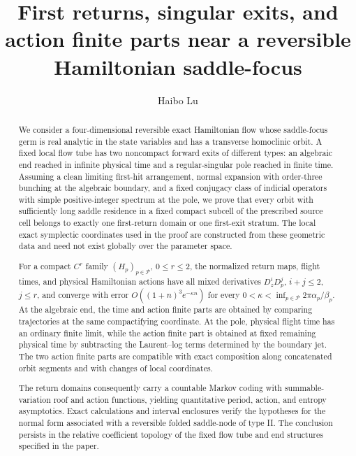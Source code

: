 \documentclass[11pt]{amsart}
\title[First returns, singular exits, and action finite parts]
{First returns, singular exits, and action finite parts
near a reversible Hamiltonian saddle-focus}
\author{Haibo Lu}
\date{}
\numberwithin{equation}{section}
\theoremstyle{definition}
\theoremstyle{remark}
\begin{document}
\begin{abstract}
We consider a four-dimensional reversible exact Hamiltonian flow whose
saddle-focus germ is real analytic in the state variables and has a
transverse homoclinic orbit.  A fixed local flow tube has two
noncompact forward exits of different types: an algebraic end reached in
infinite physical time and a regular-singular pole reached in finite time.
Assuming a clean limiting first-hit arrangement, normal expansion with
order-three bunching at the algebraic boundary, and a fixed conjugacy class
of indicial operators with simple positive-integer spectrum at the pole, we prove that every orbit
with sufficiently long saddle residence in a fixed compact subcell of the
prescribed source cell belongs to exactly one first-return domain or one
first-exit stratum.  The local exact
symplectic coordinates used in the
proof are constructed from these geometric data and need not exist
globally over the parameter space.

For a compact $C^r$ family $(H_p)_{p\in\mathcal P}$, $0\le r\le2$, the normalized return
maps, flight times, and physical Hamiltonian actions have all mixed
derivatives $D_z^iD_p^j$, $i+j\le2$, $j\le r$, and converge with error
$O((1+n)^3e^{-\kappa n})$ for every
$0<\kappa<\inf_{p\in\mathcal P}2\pi\alpha_p/\beta_p$.  At the algebraic
end, the time and action finite parts are obtained by comparing trajectories
at the same compactifying coordinate.  At the pole, physical flight time
has an ordinary finite limit, while the action finite part is obtained at
fixed remaining physical time by subtracting the Laurent--log terms
determined by the boundary jet.  The two action finite parts are compatible
with exact composition along
concatenated orbit segments and with changes of local coordinates.

The return domains consequently carry a countable Markov coding with
summable-variation roof and action functions, yielding quantitative
period, action, and entropy asymptotics.  Exact calculations and interval
enclosures verify the hypotheses for the normal form associated with a
reversible folded saddle-node of type II.  The conclusion persists in the
relative coefficient topology of the fixed flow tube and end structures
specified in the paper.
\end{abstract}

\maketitle
\end{document}
